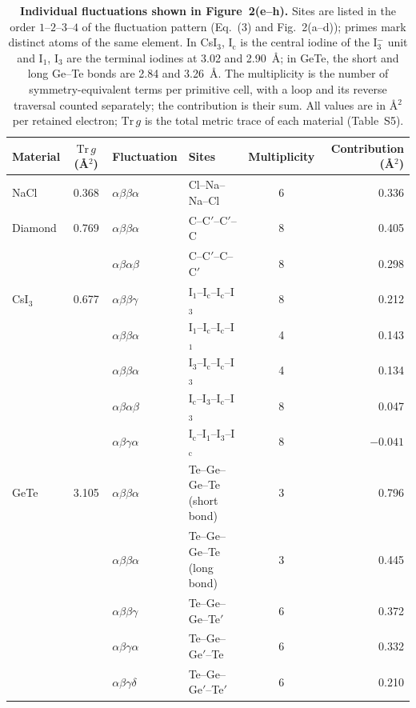 \begin{table}[htbp]
\centering
\caption{\textbf{Individual fluctuations shown in Figure~2(e--h).} Sites are listed in the order
$1$--$2$--$3$--$4$ of the fluctuation pattern (Eq.~(3) and Fig.~2(a--d)); primes mark distinct atoms
of the same element. In CsI$_3$, I$_\mathrm{c}$ is the central iodine of the I$_3^-$ unit and I$_1$,
I$_3$ are the terminal iodines at 3.02 and 2.90~\AA; in GeTe, the short and long Ge--Te bonds are
2.84 and 3.26~\AA. The multiplicity is the number of symmetry-equivalent terms per primitive cell,
with a loop and its reverse traversal counted separately; the contribution is their sum. All values
are in \AA$^2$ per retained electron; $\mathrm{Tr}\,g$ is the total metric trace of each material
(Table~S5).}
\label{tab:fig2-fluctuations}
\begin{tabular}{lcllcr}
\toprule
Material & $\mathrm{Tr}\,g$ (\AA$^2$) & Fluctuation & Sites & Multiplicity & Contribution (\AA$^2$) \\
\midrule
NaCl    & 0.368 & $\alpha\beta\beta\alpha$  & Cl--Na--Na--Cl & 6 & 0.336 \\
\midrule
Diamond & 0.769 & $\alpha\beta\beta\alpha$  & C--C$'$--C$'$--C & 8 & 0.405 \\
        &       & $\alpha\beta\alpha\beta$  & C--C$'$--C--C$'$ & 8 & 0.298 \\
\midrule
CsI$_3$ & 0.677 & $\alpha\beta\beta\gamma$  & I$_1$--I$_\mathrm{c}$--I$_\mathrm{c}$--I$_3$ & 8 & 0.212 \\
        &       & $\alpha\beta\beta\alpha$  & I$_1$--I$_\mathrm{c}$--I$_\mathrm{c}$--I$_1$ & 4 & 0.143 \\
        &       & $\alpha\beta\beta\alpha$  & I$_3$--I$_\mathrm{c}$--I$_\mathrm{c}$--I$_3$ & 4 & 0.134 \\
        &       & $\alpha\beta\alpha\beta$  & I$_\mathrm{c}$--I$_3$--I$_\mathrm{c}$--I$_3$ & 8 & 0.047 \\
        &       & $\alpha\beta\gamma\alpha$ & I$_\mathrm{c}$--I$_1$--I$_3$--I$_\mathrm{c}$ & 8 & $-0.041$ \\
\midrule
GeTe    & 3.105 & $\alpha\beta\beta\alpha$  & Te--Ge--Ge--Te (short bond) & 3 & 0.796 \\
        &       & $\alpha\beta\beta\alpha$  & Te--Ge--Ge--Te (long bond)  & 3 & 0.445 \\
        &       & $\alpha\beta\beta\gamma$  & Te--Ge--Ge--Te$'$           & 6 & 0.372 \\
        &       & $\alpha\beta\gamma\alpha$ & Te--Ge--Ge$'$--Te           & 6 & 0.332 \\
        &       & $\alpha\beta\gamma\delta$ & Te--Ge--Ge$'$--Te$'$        & 6 & 0.210 \\
\bottomrule
\end{tabular}
\end{table}
